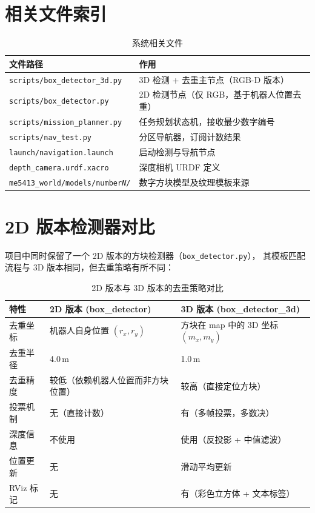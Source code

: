 \documentclass[12pt,a4paper]{article}
\begin{document}
\section{相关文件索引}

\begin{table}[H]
\centering
\caption{系统相关文件}
\label{tab:files}
\begin{tabular}{@{}lp{8cm}@{}}
\toprule
\textbf{文件路径} & \textbf{作用} \\
\midrule
\texttt{scripts/box\_detector\_3d.py} & 3D 检测 + 去重主节点（RGB-D 版本） \\
\texttt{scripts/box\_detector.py} & 2D 检测节点（仅 RGB，基于机器人位置去重） \\
\texttt{scripts/mission\_planner.py} & 任务规划状态机，接收最少数字编号 \\
\texttt{scripts/nav\_test.py} & 分区导航器，订阅计数结果 \\
\texttt{launch/navigation.launch} & 启动检测与导航节点 \\
\texttt{depth\_camera.urdf.xacro} & 深度相机 URDF 定义 \\
\texttt{me5413\_world/models/number\textit{N}/} & 数字方块模型及纹理模板来源 \\
\bottomrule
\end{tabular}
\end{table}

\section{2D 版本检测器对比}
\label{sec:2d_comparison}

项目中同时保留了一个 2D 版本的方块检测器（\texttt{box\_detector.py}），
其模板匹配流程与 3D 版本相同，但去重策略有所不同：

\begin{table}[H]
\centering
\caption{2D 版本与 3D 版本的去重策略对比}
\label{tab:2d_vs_3d}
\begin{tabular}{@{}lp{5.5cm}p{5.5cm}@{}}
\toprule
\textbf{特性} & \textbf{2D 版本 (box\_detector)} & \textbf{3D 版本 (box\_detector\_3d)} \\
\midrule
去重坐标 & 机器人自身位置 $(r_x, r_y)$ & 方块在 map 中的 3D 坐标 $(m_x, m_y)$ \\
去重半径 & 4.0\,m & 1.0\,m \\
去重精度 & 较低（依赖机器人位置而非方块位置） & 较高（直接定位方块） \\
投票机制 & 无（直接计数） & 有（多帧投票，多数决） \\
深度信息 & 不使用 & 使用（反投影 + 中值滤波） \\
位置更新 & 无 & 滑动平均更新 \\
RViz 标记 & 无 & 有（彩色立方体 + 文本标签） \\
\bottomrule
\end{tabular}
\end{table}
\end{document}
